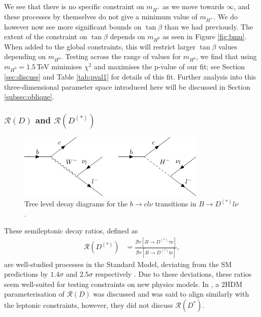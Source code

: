 \documentclass[a4paper,12pt]{article}
\begin{document}
We see that there is no specific constraint on $m_{H^+}$ as we move towards $\infty$, and these processes by themselves do not give a minimum value of $m_{H^+}$. 
We do however now see more significant bounds on $\tan\beta$ than we had previously. 
The extent of the constraint on $\tan\beta$ depends on $m_{H^0}$ as seen in Figure \ref{fig:bmu}.
When added to the global constraints, this will restrict larger $\tan\beta$ values depending on $m_{H^0}$.
Testing across the range of values for $m_{H^0}$, we find that using $m_{H^0}=1.5\,$TeV minimises $\chi^2$ and maximises the p-value of our fit; see Section \ref{sec:discuss} and Table \ref{tab:pval1} for details of this fit.
Further analysis into this three-dimensional parameter space introduced here will be discussed in Section \ref{subsec:oblique}.

\subsubsection{$\mathcal{R}(D)$ and $\mathcal{R}(D^{(*)})$}
\begin{figure}[H]
    \centering
    \includegraphics[width=0.8\textwidth]{bclnu.pdf}
    \caption{\label{fig:bclnu}Tree level decay diagrams for the $b\to cl\nu$ transitions in $B\to D^{(*)}l\nu$.}
\end{figure}
These semileptonic decay ratios, defined as
\begin{align}
    \mathcal{R}(D^{(*)}) &=\frac{\mathcal{B}r[B\to D^{(*)}\tau\nu]}{\mathcal{B}r[B\to D^{(*)}l\nu]},
\end{align}
are well-studied processes in the Standard Model, deviating from the SM predictions by $1.4\sigma$ and $2.5\sigma$ respectively \cite{pdg}. 
Due to these deviations, these ratios seem well-suited for testing constraints on new physics models. 
In \cite{desc}, a 2HDM parameterisation of $\mathcal{R}(D)$ was discussed and was said to align similarly with the leptonic constraints, however, they did not discuss $\mathcal{R}(D^*)$. 
\end{document}
